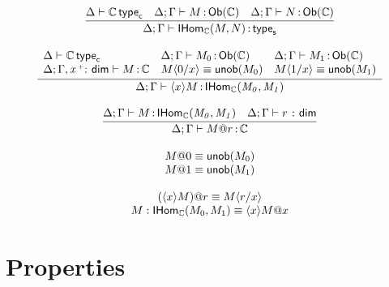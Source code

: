 \documentclass[11pt]{article}
\theoremstyle{plain}
\newtheorem{lem}{Lemma}[section]
\begin{document}
\[
\begin{array}{c}
\infer{\wftpsf{\Delta}{\Gamma}{\HomO{\C}{M}{N}}}
      {\wftpcc{\Delta}{\C} &
        \oftpsf{\Delta}{\Gamma}{M}{\obtp \C} & 
        \oftpsf{\Delta}{\Gamma}{N}{\obtp \C} 
      }
\\ \\
\infer{\oftpsf{\Delta}{\Gamma}{\nlam{x}{M}}{\HomO{\C}{M_0}{M_1}}}
      {\begin{array}{lll}
          \wftpcc{\Delta}{\C} & 
          \oftpsf{\Delta}{\Gamma}{M_0}{\obtp{\C}} & 
          \oftpsf{\Delta}{\Gamma}{M_1}{\obtp{\C}} \\
          \oftpc{\Delta}{\Gamma,\vdimtm{x}{\co}}{M}{\C} &
          \nsubst{M}{0}{x} \deq \unob{M_0} & 
          \nsubst{M}{1}{x} \deq \unob{M_1} \\
       \end{array}
      }
\\ \\
\infer{\oftpsf{\Delta}{\Gamma}{\napp{M}{r}}{\C}}
      {\oftpc{\Delta}{\Gamma}{M}{\HomO{\C}{M_0}{M_1}} &
        \wfdimc{\Delta}{\Gamma}{r}
      }
\\ \\
\napp{M}{0} \deq \unob{M_0} \\ 
\napp{M}{1} \deq \unob{M_1} \\ 
\\ 
\napp{(\nlam{x}{M})}{r} \deq \nsubst{M}{r}{x} \\
M : \HomO{\C}{M_0}{M_1} \deq \nlam{x}{\napp{M}{x}}\\
\end{array}
\]


\section{Properties}




\end{document}
